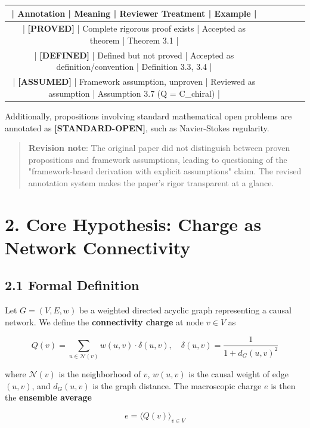 \documentclass[11pt,a4paper]{article}
\theoremstyle{plain}
\theoremstyle{definition}
\begin{document}
\begin{table}[h]
\centering
\begin{tabular}{|c|c|c|c|c|c|}
\hline
| Annotation | Meaning | Reviewer Treatment | Example | \\ \hline
| \textbf{[PROVED]} | Complete rigorous proof exists | Accepted as theorem | Theorem 3.1 | \\ \hline
| \textbf{[DEFINED]} | Defined but not proved | Accepted as definition/convention | Definition 3.3, 3.4 | \\ \hline
| \textbf{[ASSUMED]} | Framework assumption, unproven | Reviewed as assumption | Assumption 3.7 (Q = C_chiral) | \\ \hline
\end{tabular}
\end{table}

Additionally, propositions involving standard mathematical open problems are annotated as \textbf{[STANDARD-OPEN]}, such as Navier-Stokes regularity.

\begin{quote}
\textbf{Revision note}: The original paper did not distinguish between proven propositions and framework assumptions, leading to questioning of the "framework-based derivation with explicit assumptions" claim. The revised annotation system makes the paper's rigor transparent at a glance.
\end{quote}

\section{2. Core Hypothesis: Charge as Network Connectivity}

\subsection{2.1 Formal Definition}

Let $G = (V, E, w)$ be a weighted directed acyclic graph representing a causal network. We define the \textbf{connectivity charge} at node $v \in V$ as

$$Q(v) = \sum_{u \in \mathcal{N}(v)} w(u,v) \cdot \delta(u,v), \quad \delta(u,v) = \frac{1}{1 + d_G(u,v)^2}$$

where $\mathcal{N}(v)$ is the neighborhood of $v$, $w(u,v)$ is the causal weight of edge $(u,v)$, and $d_G(u,v)$ is the graph distance. The macroscopic charge $e$ is then the \textbf{ensemble average}

$$e = \langle Q(v) \rangle_{v \in V}$$
\end{document}
